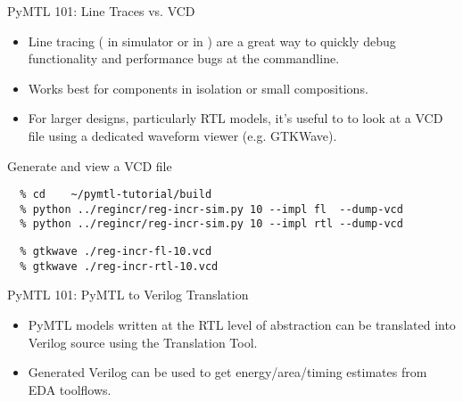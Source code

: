 \begin{frame}{PyMTL 101: Line Traces vs. VCD}

\begin{itemize}
\item Line tracing ( in simulator or  in )
      are a great way to quickly debug functionality and performance bugs
      at the commandline.
\item Works best for components in isolation or small compositions.
\item For larger designs, particularly RTL models, it's useful to to look
      at a VCD file using a dedicated waveform viewer (e.g. GTKWave).
\end{itemize}
\end{frame}

\begin{task}\begin{frame}[fragile]{Generate and view a VCD file}
\vspace{-0.25in}
\begin{verbatim}
  % cd    ~/pymtl-tutorial/build
  % python ../regincr/reg-incr-sim.py 10 --impl fl  --dump-vcd
  % python ../regincr/reg-incr-sim.py 10 --impl rtl --dump-vcd
\end{verbatim}

\begin{verbatim}
  % gtkwave ./reg-incr-fl-10.vcd
  % gtkwave ./reg-incr-rtl-10.vcd
\end{verbatim}
\end{frame}
\end{task}

\begin{frame}{PyMTL 101: PyMTL to Verilog Translation}

\begin{itemize}
  \item PyMTL models written at the RTL level of abstraction can be
        translated into Verilog source using the Translation Tool.
  \smallskip
  \item Generated Verilog can be used to get energy/area/timing estimates
        from EDA toolflows.
\end{itemize}

\vspace{0.3in}


\end{frame}

